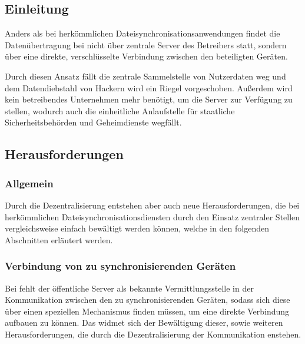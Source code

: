 \subsection{Einleitung}
Anders als bei herkömmlichen Dateisynchronisationsanwendungen findet die
Datenübertragung bei \sblit nicht über zentrale Server des Betreibers statt,
sondern über eine direkte, verschlüsselte Verbindung zwischen den beteiligten
Geräten.

Durch diesen Ansatz fällt die zentrale Sammelstelle von Nutzerdaten
weg und dem Datendiebstahl von Hackern wird ein Riegel vorgeschoben. Außerdem
wird kein betreibendes Unternehmen mehr benötigt, um die Server zur Verfügung zu
stellen, wodurch auch die einheitliche Anlaufstelle für staatliche Sicherheitsbehörden
und Geheimdienste wegfällt.

\subsection{Herausforderungen}
\subsubsection{Allgemein}
Durch die Dezentralisierung entstehen aber auch neue Herausforderungen, die bei
herkömmlichen Dateisynchronisationsdiensten durch den Einsatz zentraler Stellen
vergleichsweise einfach bewältigt werden können, welche in den folgenden Abschnitten erläutert werden.

\subsubsection{Verbindung von zu synchronisierenden Geräten}
Bei \sblit fehlt der öffentliche Server als bekannte Vermittlungsstelle in der Kommunikation
zwischen den zu synchronisierenden Geräten, sodass sich diese über einen speziellen
Mechanismus finden müssen, um eine direkte Verbindung aufbauen zu können.
Das  widmet sich der Bewältigung dieser, sowie weiteren Herausforderungen, die
durch die Dezentralisierung der Kommunikation enstehen.

